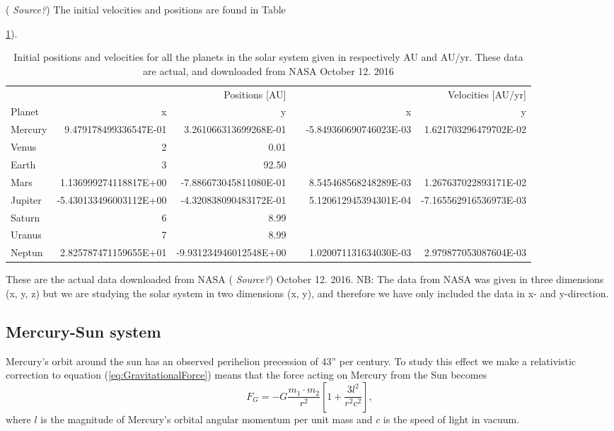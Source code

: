 \documentclass[norsk,a4paper,12pt]{article}
\begin{document}
(\emph{\color{red} Source?}) The initial velocities and positions are found in Table {\ref{table:Positions}).
\begin{table}[H]
\centering
\label{table:Positions}
\caption{Initial positions and velocities for all the planets in the solar system given in respectively AU and AU/yr. These data are actual, and downloaded from NASA October 12. 2016}
\begin{tabular}{lrrrrr}
\hline
\multicolumn{3}{r}{Positions [AU]} & \multicolumn{3}{r}{Velocities [AU/yr]} \\
\cline{2-3}
\cline{5-6}
Planet           & x & y &  & x & y \\
\hline
Mercury      & 9.479178499336547E-01 & 3.261066313699268E-01 & & -5.849360690746023E-03 &1.621703296479702E-02\\
Venus        & 2        & 0.01       \\
Earth        & 3     & 92.50      \\
Mars         & 1.136999274118817E+00     & -7.886673045811080E-01 & & 8.545468568248289E-03 & 1.267637022893171E-02      \\
Jupiter      & -5.430133496003112E+00    & -4.320838090483172E-01 & & 5.120612945394301E-04 & -7.165562916536973E-03    \\
Saturn       & 6      & 8.99       \\
Uranus 		 & 7      & 8.99       \\
Neptun 		 & 2.825787471159655E+01      & -9.931234946012548E+00 & & 1.020071131634030E-03 & 2.979877053087604E-03       \\
\hline
\end{tabular}
\end{table}
These are the actual data downloaded from NASA (\emph{\color{red} Source?}) October 12. 2016. NB: The data from NASA was given in three dimensions (x, y, z) but we are studying the solar system in two dimensions (x, y), and therefore we have only included the data in x- and y-direction.\par\vspace{3mm}

\subsection{Mercury-Sun system}
Mercury's orbit around the sun has an observed perihelion precession of 43'' per century. To study this effect we make a relativistic correction to equation (\ref{eq:GravitationalForce}) means that the force acting on Mercury from the Sun becomes
\begin{equation}
F_G=-G\frac{m_1\cdot m_2}{r^2} \left[1 + \frac{3l^2}{r^2c^2}\right], 
\label{eq:GravitationalForceRelativistic}
\end{equation}
where $l$ is the magnitude of Mercury's orbital angular momentum per unit mass and $c$ is the speed of light in vacuum. 

}
\end{document}
